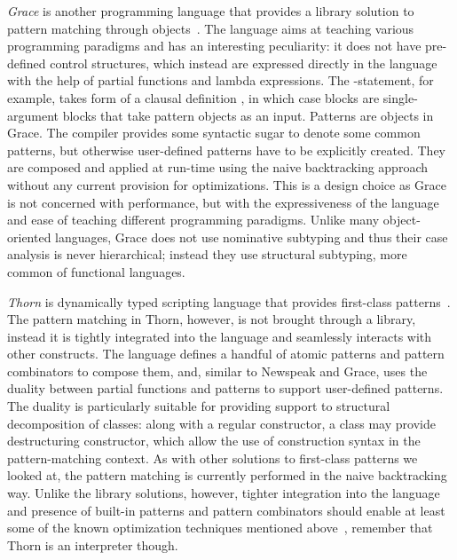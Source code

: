 \emph{Grace} is another programming language that provides a library solution to 
pattern matching through objects~\cite{Grace2012}. The language aims at 
teaching various programming paradigms and has an interesting peculiarity: it 
does not have pre-defined control structures, which instead are expressed 
directly in the language with the help of partial functions and lambda 
expressions. The -statement, for example, takes form of a 
clausal definition , in which case 
blocks  are single-argument blocks that take pattern objects as 
an input. Patterns are objects in Grace. The compiler provides some syntactic 
sugar to denote some common patterns, but otherwise user-defined patterns have 
to be explicitly created. They are composed and applied at run-time using the 
naive backtracking approach without any current provision for optimizations. 
This is a design choice as Grace is not concerned with performance, but with the 
expressiveness of the language and ease of teaching different programming 
paradigms. Unlike many object-oriented languages, Grace does not use nominative 
subtyping and thus their case analysis is never hierarchical; instead they use 
structural subtyping, more common of functional languages.


\emph{Thorn} is dynamically typed scripting language that provides first-class 
patterns~\cite{Thorn2012}. The pattern matching in Thorn, however, is not 
brought through a library, instead it is tightly integrated into the language 
and seamlessly interacts with other constructs. The language defines a handful 
of atomic patterns and pattern combinators to compose them, and, similar to 
Newspeak and Grace, uses the duality between partial functions and patterns to 
support user-defined patterns. The duality is particularly suitable for 
providing support to structural decomposition of classes: along with a regular 
constructor, a class may provide destructuring constructor, which allow the use 
of construction syntax in the pattern-matching context. As with other solutions 
to first-class patterns we looked at, the pattern matching is currently 
performed in the naive backtracking way. Unlike the library solutions, however, 
tighter integration into the language and presence of built-in patterns and 
pattern combinators should enable at least some of the known optimization 
techniques mentioned above~\cite{OPM01,Maranget08}, remember that Thorn is an 
interpreter though.


